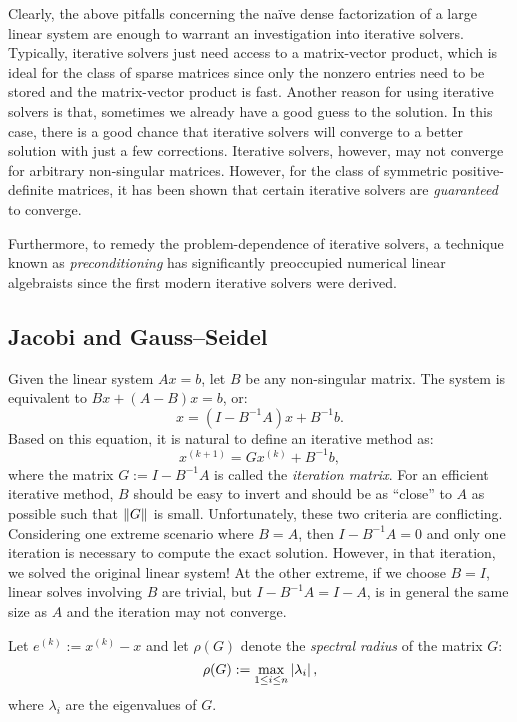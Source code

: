 Clearly, the above pitfalls concerning the na\"ive dense factorization of a large linear system are enough to warrant an investigation into iterative solvers. Typically, iterative solvers just need access to a matrix-vector product, which is ideal for the class of sparse matrices since only the nonzero entries need to be stored and the matrix-vector product is fast. Another reason for using iterative solvers is that, sometimes we already have a good guess to the solution. In this case, there is a good chance that iterative solvers will converge to a better solution with just a few corrections. Iterative solvers, however, may not converge for arbitrary non-singular matrices. However, for the class of symmetric positive-definite matrices, it has been shown that certain iterative solvers are {\em guaranteed} to converge.

Furthermore, to remedy the problem-dependence of iterative solvers, a technique known as {\em preconditioning} has significantly preoccupied numerical linear algebraists since the first modern iterative solvers were derived.

\subsection{Jacobi and Gauss--Seidel}

Given the linear system $Ax=b$, let $B$ be any non-singular matrix. The system is equivalent to $Bx + (A-B)x = b$, or:
\begin{equation}\label{eq:IterationEquivalentSystem}
x = (I-B^{-1}A)x + B^{-1}b.
\end{equation}
Based on this equation, it is natural to define an iterative method as:
\begin{equation}\label{eq:IterativeMethod}
x^{(k+1)} = G x^{(k)} + B^{-1}b,
\end{equation}
where the matrix $G := I-B^{-1}A$ is called the {\em iteration matrix}. For an efficient iterative method, $B$ should be easy to invert and should be as ``close'' to $A$ as possible such that $\left\|{G}\right\|$ is small. Unfortunately, these two criteria are conflicting. Considering one extreme scenario where $B=A$, then $I-B^{-1}A = 0$ and only one iteration is necessary to compute the exact solution. However, in that iteration, we solved the original linear system! At the other extreme, if we choose $B=I$, linear solves involving $B$ are trivial, but $I-B^{-1}A = I-A$, is in general the same size as $A$ and the iteration may not converge.

Let $e^{(k)} := x^{(k)} - x$ and let $\rho(G)$ denote the {\em spectral radius} of the matrix $G$:
\[
\rho(G) := \max_{1\le i\le n}\left|{\lambda_i}\right|,
\]
where $\lambda_i$ are the eigenvalues of $G$. 

